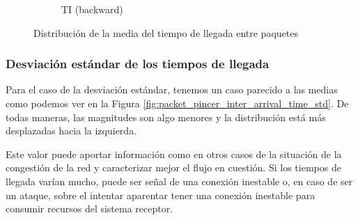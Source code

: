 \begin{figure}[H]
\begin{subfigure}[b]{0.32\textwidth}
        \caption{TI (backward)}
    \end{subfigure}
    \hfill
       \caption{Distribución de la media del tiempo de llegada entre paquetes}
       \label{fig:packet_pincer_inter_arrival_time_mean}
\end{figure}

\subsubsection{Desviación estándar de los tiempos de llegada}

Para el caso de la desviación estándar, tenemos un caso parecido a las medias como podemos ver en la Figura \ref{fig:packet_pincer_inter_arrival_time_std}. De todas maneras, las magnitudes son algo menores y la distribución está más desplazadas hacia la izquierda. 

Este valor puede aportar información como en otros casos de la situación de la congestión de la red y caracterizar mejor el flujo en cuestión. Si los tiempos de llegada varían mucho, puede ser señal de una conexión inestable o, en caso de ser un ataque, sobre el intentar aparentar tener una conexión inestable para consumir recursos del sistema receptor.

